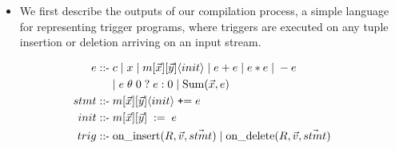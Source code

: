 \begin{itemize}
  \item We first describe the outputs of our compilation process, a simple
  language for representing trigger programs, where triggers are executed on
  any tuple insertion or deletion arriving on an input stream. 
\end{itemize}

\def\mtins{\mbox{on\_insert}}
\def\mtdel{\mbox{on\_delete}}
\begin{align*}
e \; \mbox{::-} & \;
  c \;|\; x \;|\;
  m[\vec{x}][\vec{y}]\tuple{init}
\comment{
  \;|\; e[\vec{w}][\vec{x}] * e[\vec{y}][\vec{z}]
  \;|\; e[\vec{w}][\vec{x}] + e[\vec{y}][\vec{z}]
\\
& 
}
\comment{
  \;|\; e[\vec{w}][\vec{x}] \;\{+,*,-\}\; e[\vec{y}][\vec{z}]
  \;|\; e[\vec{x}][] \;\theta\; 0 \; ? \; e[\vec{y}][\vec{z}] :0
}
  \;|\; e + e \;|\; e * e \;|\; -e
\\
& 
  \;|\; e \;\theta\; 0 \; ? \; e : 0
  \;|\; \calcsum(\vec{x}, e)
\\
stmt \; \mbox{::-} & \; m[\vec{x}][\vec{y}]\tuple{init}
     \; \mbox{{\tt+}=} \; e\\
init \; \mbox{::-} & \; m[\vec{x}][\vec{y}]\comment{\tuple{init}}
     \; := \; e\\
trig \; \mbox{::-} & \; \mtins(R,\vec{v},\vec{stmt}) \;|\;
\mtdel(R,\vec{v},\vec{stmt})
\end{align*}

